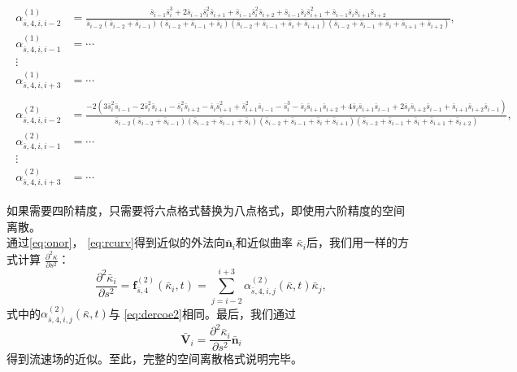 \documentclass[a4paper,twoside]{ctexart}
\begin{document}
  \begin{footnotesize}
  \begin{eqnarray}
    \begin{aligned}
      \label{eq:dercoe1}
  \alpha_{\bar{s},4,i,i-2}^{(1)} &=
  \frac{\bar{s}_{i-1}\bar{s}_{i}^3+2\bar{s}_{i-1}\bar{s}_{i}^2\bar{s}_{i+1}+\bar{s}_{i-1}\bar{s}_{i}^2\bar{s}_{i+2}+\bar{s}_{i-1}\bar{s}_{i}\bar{s}_{i+1}^2+\bar{s}_{i-1}\bar{s}_{i}\bar{s}_{i+1}\bar{s}_{i+2}}{\bar{s}_{i-2}(\bar{s}_{i-2}+\bar{s}_{i-1})(\bar{s}_{i-2}+\bar{s}_{i-1}+\bar{s}_{i})(\bar{s}_{i-2}+\bar{s}_{i-1}+\bar{s}_{i}+\bar{s}_{i+1})(\bar{s}_{i-2}+\bar{s}_{i-1}+\bar{s}_{i}+\bar{s}_{i+1}+\bar{s}_{i+2})},
  \\
  \alpha_{\bar{s},4,i,i-1}^{(1)} &= \cdots\\
  \vdots\\
  \alpha_{\bar{s},4,i,i+3}^{(1)} &= \cdots
\end{aligned}
  \end{eqnarray}
\begin{eqnarray}
\begin{aligned}
      \label{eq:dercoe2}
  \alpha_{\bar{s},4,i,i-2}^{(2)} &=
  \frac{-2(3\bar{s}_{i}^2\bar{s}_{i-1}\! -\!2\bar{s}_{i}^2\bar{s}_{i+1}\! -\!\bar{s}_{i}^2\bar{s}_{i+2}\! -\!\bar{s}_{i}\bar{s}_{i+1}^2\! +\!\bar{s}_{i+1}^2\bar{s}_{i-1}\! -\!\bar{s}_{i}^3\! -\!\bar{s}_{i}\bar{s}_{i+1}\bar{s}_{i+2}\! +\!4\bar{s}_{i}\bar{s}_{i+1}\bar{s}_{i-1}\! +\!2\bar{s}_{i}\bar{s}_{i+2}\bar{s}_{i-1}\! +\!\bar{s}_{i+1}\bar{s}_{i+2}\bar{s}_{i-1})}{\bar{s}_{i-2}(\bar{s}_{i-2}+\bar{s}_{i-1})(\bar{s}_{i-2}+\bar{s}_{i-1}+\bar{s}_{i})(\bar{s}_{i-2}+\bar{s}_{i-1}+\bar{s}_{i}+\bar{s}_{i+1})(\bar{s}_{i-2}+\bar{s}_{i-1}+\bar{s}_{i}+\bar{s}_{i+1}+\bar{s}_{i+2})},
  \\
  \alpha_{\bar{s},4,i,i-1}^{(2)} &= \cdots\\
  \vdots\\
  \alpha_{\bar{s},4,i,i+3}^{(2)} &= \cdots
  \end{aligned}                               
\end{eqnarray}
\end{footnotesize}
\indent 如果需要四阶精度，只需要将六点格式替换为八点格式，即使用六阶精度的空间
离散。\\
\indent 通过\eqref{eq:onor}，
  \eqref{eq:rcurv}得到近似的外法向$\bar{\boldsymbol n}_i$和近似曲率
  $\bar{\kappa}_i$后，我们用一样的方式计算
  $\frac{\partial^2\kappa}{\partial s^2}$：
  \begin{equation}
    \label{eq:calderkappa}
    \frac{\partial^2\bar{\kappa}_i}{\partial s^2} =
    \boldsymbol f_{\bar{s},4}^{(2)}(\bar{\kappa}_i,t) = \sum_{j=i-2}^{i+3}\alpha_{\bar{s},4,i,j}^{(2)}(\bar{\kappa},t) \bar{\kappa}_j,
  \end{equation}
  式中的$\alpha_{\bar{s},4,i,j}^{(2)}(\bar{\kappa},t)$与
  \eqref{eq:dercoe2}相同。最后，我们通过
  \begin{equation}
    \label{eq:calv}
    \bar{\boldsymbol V}_i = \frac{\partial^2\bar{\kappa}_i}{\partial s^2}
    \bar{\boldsymbol n}_i
  \end{equation}
  得到流速场的近似。至此，完整的空间离散格式说明完毕。
\end{document}
